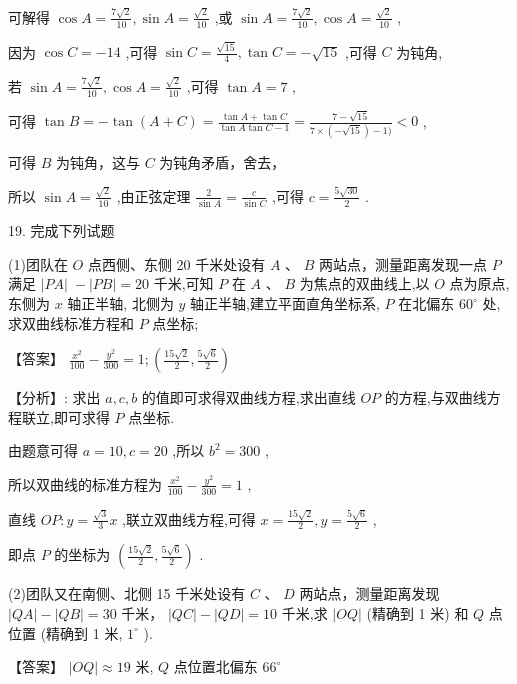 \documentclass[10pt]{article}
\begin{document}
可解得 \(\cos A = \frac{7\sqrt{2}}{10},\sin A = \frac{\sqrt{2}}{10}\) ,或 \(\sin A = \frac{7\sqrt{2}}{10},\cos A = \frac{\sqrt{2}}{10}\) ,

因为 \(\cos C =  - {14}\) ,可得 \(\sin C = \frac{\sqrt{15}}{4},\tan C =  - \sqrt{15}\) ,可得 \(C\) 为钝角,

若 \(\sin A = \frac{7\sqrt{2}}{10},\cos A = \frac{\sqrt{2}}{10}\) ,可得 \(\tan A = 7\) ,

可得 \(\tan B =  - \tan \left( {A + C}\right)  = \frac{\tan A + \tan C}{\tan A\tan C - 1} = \frac{7 - \sqrt{15}}{7 \times  \left( {-\sqrt{15}}\right)  - 1)} < 0\) ,

可得 \(B\) 为钝角，这与 \(C\) 为钝角矛盾，舍去，

所以 \(\sin A = \frac{\sqrt{2}}{10}\) ,由正弦定理 \(\frac{2}{\sin A} = \frac{c}{\sin C}\) ,可得 \(c = \frac{5\sqrt{30}}{2}\) .

19. 完成下列试题

(1)团队在 \(O\) 点西侧、东侧 20 千米处设有 \(A\) 、 \(B\) 两站点，测量距离发现一点 \(P\) 满足 \(\left| {PA}\right| \; - \left| {PB}\right|  = {20}\) 千米,可知 \(P\) 在 \(A\text{ 、 }B\) 为焦点的双曲线上,以 \(O\) 点为原点,东侧为 \(x\) 轴正半轴, 北侧为 \(y\) 轴正半轴,建立平面直角坐标系, \(P\) 在北偏东 \({60}^{ \circ  }\) 处,求双曲线标准方程和 \(P\) 点坐标;

【答案】 \(\frac{{x}^{2}}{100} - \frac{{y}^{2}}{300} = 1;\left( {\frac{{15}\sqrt{2}}{2},\frac{5\sqrt{6}}{2}}\right)\)

【分析】: 求出 \(a,c,b\) 的值即可求得双曲线方程,求出直线 \({OP}\) 的方程,与双曲线方程联立,即可求得 \(P\) 点坐标.

由题意可得 \(a = {10},c = {20}\) ,所以 \({b}^{2} = {300}\) ,

所以双曲线的标准方程为 \(\frac{{x}^{2}}{100} - \frac{{y}^{2}}{300} = 1\) ,

直线 \({OP} : y = \frac{\sqrt{3}}{3}x\) ,联立双曲线方程,可得 \(x = \frac{{15}\sqrt{2}}{2},y = \frac{5\sqrt{6}}{2}\) ,

即点 \(P\) 的坐标为 \(\left( {\frac{{15}\sqrt{2}}{2},\frac{5\sqrt{6}}{2}}\right)\) .

(2)团队又在南侧、北侧 15 千米处设有 \(C\) 、 \(D\) 两站点，测量距离发现 \(\left| {QA}\right|  - \left| {QB}\right|  = {30}\) 千米， \(\left| {QC}\right|  - \left| {QD}\right|  = {10}\) 千米,求 \(\left| {OQ}\right|\) (精确到 1 米) 和 \(Q\) 点位置 (精确到 1 米, \({1}^{ \circ  }\) ).

【答案】 \(\left| {OQ}\right|  \approx  {19}\) 米, \(Q\) 点位置北偏东 \({66}^{ \circ  }\)
\end{document}

